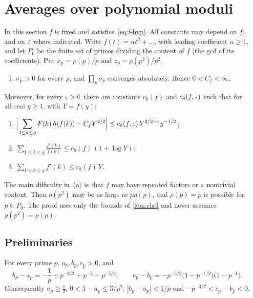 \section{Averages over polynomial moduli}\label{sec:poly}

In this section $f$ is fixed and satisfies~\eqref{eq:f-hyp}. All constants may depend on $f$, and on $\varepsilon$ where indicated. Write $f(t)=\alpha t^d+\dots$, with leading coefficient $\alpha\ge1$, and let $P_0$ be the finite set of primes dividing the content of $f$ (the gcd of its coefficients). Put $x_p=\rho(p)/p$ and $z_p=\rho(p^2)/p^2$.

\begin{proposition}\label{prop:poly}
\leavevmode
\begin{enumerate}[label=\textup{(\arabic*)},start=0]
\item $\sigma_p>0$ for every $p$, and $\prod_p\sigma_p$ converges absolutely. Hence $0<C_f<\infty$.
\end{enumerate}
Moreover, for every $\varepsilon>0$ there are constants $c_8(f)$ and $c_8(f,\varepsilon)$ such that for all real $y\ge1$, with $Y=f(y)$:
\begin{enumerate}[label=\textup{(\alph*)}]
\item $\displaystyle\Bigl|\sum_{1\le k\le y}F(k)\,h(f(k))-C_fY^{3/2}\Bigr|\le c_8(f,\varepsilon)\,Y^{3/2+\varepsilon}y^{-1/2}$;
\item $\displaystyle\sum_{1\le k\le y}\frac{f'(k)}{f(k)}\le c_8(f)\,(1+\log Y)$;
\item $\displaystyle\sum_{1\le k\le y}f'(k)\le c_8(f)\,Y$.
\end{enumerate}
\end{proposition}

The main difficulty in~(a) is that $f$ may have repeated factors or a nontrivial content. Then $\rho(p^2)$ may be as large as $p\rho(p)$, and $\rho(p)=p$ is possible for $p\in P_0$. The proof uses only the bounds of \cref{lem:rho} and never assumes $\rho(p^2)=\rho(p)$.

\subsection{Preliminaries}

\begin{lemma}\label{lem:local}
For every prime $p$, $a_p,b_p,c_p>0$, and
\[
b_p-a_p=-\frac1p+p^{-3/2}+p^{-2}-p^{-5/2},\qquad c_p-b_p=-p^{-3/2}\bigl(1-p^{-1/2}\bigr)\bigl(1-p^{-1}\bigr).
\]
Consequently $a_p\ge\frac12$, $0<1-a_p\le3/p^2$, $|b_p-a_p|<1/p$ and $-p^{-3/2}<c_p-b_p<0$.
\end{lemma}

